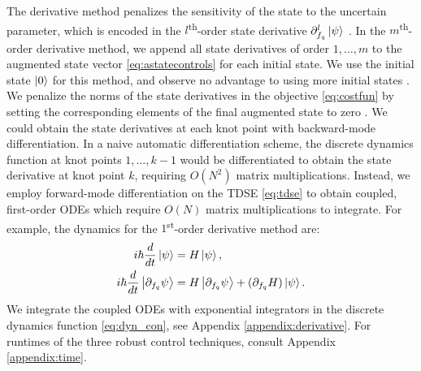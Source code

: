 The derivative method penalizes the sensitivity of the state
to the uncertain parameter, which is encoded in the $l$\textsuperscript{th}-order
state derivative $\partial_{f_{q}}^{l} \ket{\psi}$ .
In the $m$\textsuperscript{th}-order
derivative method, we append all state derivatives of order $1, \dots, m$
to the augmented state vector \eqref{eq:astatecontrols}
for each initial state. We use the initial state $\ket{0}$ for this method,
and observe no advantage to using more initial states
.
We penalize the norms of the state derivatives
in the objective \eqref{eq:costfun} by setting the corresponding elements
of the final augmented state to zero
.
We could obtain the state derivatives at each knot point
with backward-mode differentiation.
In a naive automatic differentiation scheme,
the discrete dynamics function at knot points
$1, \dots, k - 1$ would be differentiated to obtain the state
derivative at knot point $k$, requiring
$O(N^{2})$ matrix multiplications. Instead, we 
employ forward-mode differentiation on the TDSE \eqref{eq:tdse}
to obtain coupled, first-order ODEs
which require $O(N)$ matrix multiplications to integrate.
For example, the dynamics for the $1$\textsuperscript{st}-order derivative method are:
\begin{align}
  i \hbar \frac{d}{dt} \ket{\psi} &= H \ket{\psi},\\
  i \hbar \frac{d}{dt} \ket{\partial_{f_{q}}\psi} &=
  H \ket{\partial_{f_{q}} \psi} +
  (\partial_{f_{q}} H) \ket{\psi}.
  \label{eq:d1dyn}
\end{align}
We integrate the coupled ODEs with exponential
integrators
in the discrete dynamics function \eqref{eq:dyn_con}, see Appendix \ref{appendix:derivative}.
For runtimes
of the three robust control techniques,
consult Appendix \ref{appendix:time}.

